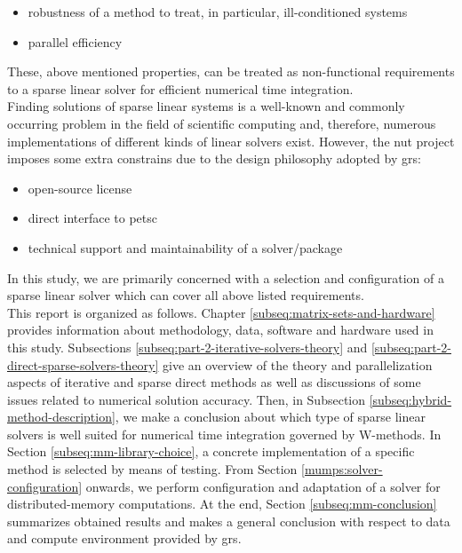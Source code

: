 \begin{itemize}
	\item robustness of a method to treat, in particular, ill-conditioned systems
	\item parallel efficiency
\end{itemize}


These, above mentioned properties, can be treated as non-functional requirements to a sparse linear solver for efficient numerical time integration.\\

 
Finding solutions of sparse linear systems is a well-known and commonly occurring problem in the field of scientific computing and, therefore, numerous implementations of different kinds of linear solvers exist. However, the \acrshort{nut} project imposes some extra constrains due to the design philosophy adopted by \acrshort{grs}: \\


\begin{itemize}
	\item open-source license
	\item direct interface to \acrshort{petsc}
	\item technical support and maintainability of a solver/package
\end{itemize}



In this study, we are primarily concerned with a selection and configuration of a  sparse linear solver which can cover all above listed requirements.\\


This report is organized as follows. Chapter \ref{subseq:matrix-sets-and-hardware} provides information about methodology, data, software and hardware used in this study. Subsections \ref{subseq:part-2-iterative-solvers-theory} and \ref{subseq:part-2-direct-sparse-solvers-theory} give an overview of the theory and parallelization aspects of iterative and sparse direct methods as well as discussions of some issues related to numerical solution accuracy. Then, in Subsection \ref{subseq:hybrid-method-description}, we make a conclusion about which type of sparse linear solvers is well suited for numerical time integration governed by W-methods. In Section \ref{subseq:mm-library-choice}, a concrete implementation of a specific method is selected by means of testing. From Section \ref{mumps:solver-configuration} onwards, we perform configuration and adaptation of a solver for distributed-memory computations. At the end, Section \ref{subseq:mm-conclusion} summarizes obtained results and makes a general conclusion with respect to data and compute environment provided by  \acrshort{grs}.\\


